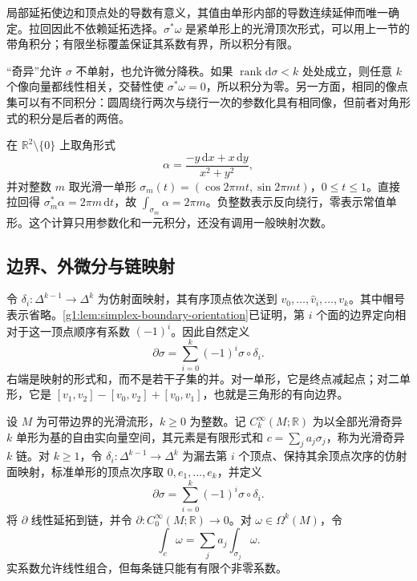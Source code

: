 局部延拓使边和顶点处的导数有意义，其值由单形内部的导数连续延伸而唯一确定。拉回因此不依赖延拓选择。\(\sigma^*\omega\) 是紧单形上的光滑顶次形式，可以用上一节的带角积分；有限坐标覆盖保证其系数有界，所以积分有限。

\ProseParagraphBreak

“奇异”允许 \(\sigma\) 不单射，也允许微分降秩。如果 \(\operatorname{rank}\mathrm{d}\sigma<k\) 处处成立，则任意 \(k\) 个像向量都线性相关，交替性使 \(\sigma^*\omega=0\)，所以积分为零。另一方面，相同的像点集可以有不同积分：圆周绕行两次与绕行一次的参数化具有相同像，但前者对角形式的积分是后者的两倍。

\begin{example}
	\label{g1:exm:circle-simplex-integral}
	在 \(\mathbb R^2\setminus\{0\}\) 上取角形式
	\[
		\alpha=\frac{-y\,\mathrm{d}x+x\,\mathrm{d}y}{x^2+y^2},
	\]
	并对整数 \(m\) 取光滑一单形 \(\sigma_m(t)=(\cos 2\pi mt,\sin 2\pi mt)\)，\(0\leq t\leq1\)。直接拉回得 \(\sigma_m^*\alpha=2\pi m\,\mathrm{d}t\)，故 \(\int_{\sigma_m}\alpha=2\pi m\)。负整数表示反向绕行，零表示常值单形。这个计算只用参数化和一元积分，还没有调用一般映射次数。
\end{example}

\subsection{边界、外微分与链映射}
\label{g1:subsec:1405:02}

令 \(\delta_i:\Delta^{k-1}\to\Delta^k\) 为仿射面映射，其有序顶点依次送到 \(v_0,\ldots,\widehat v_i,\ldots,v_k\)。其中帽号表示省略。\cref{g1:lem:simplex-boundary-orientation}已证明，第 \(i\) 个面的边界定向相对于这一顶点顺序有系数 \((-1)^i\)。因此自然定义
\[
	\partial\sigma=\sum_{i=0}^k(-1)^i\sigma\circ\delta_i.
\]
右端是映射的形式和，而不是若干子集的并。对一单形，它是终点减起点；对二单形，它是 \([v_1,v_2]-[v_0,v_2]+[v_0,v_1]\)，也就是三角形的有向边界。

\begin{definition}
	\label{g1:def:smooth-singular-chains}
	设 \(M\) 为可带边界的光滑流形，\(k\ge0\) 为整数。记 \(C_k^\infty(M;\mathbb R)\) 为以全部光滑奇异 \(k\) 单形为基的自由实向量空间，其元素是有限形式和 \(c=\sum_j a_j\sigma_j\)，称为光滑奇异 \(k\) 链。对 \(k\ge1\)，令 \(\delta_i:\Delta^{k-1}\to\Delta^k\) 为漏去第 \(i\) 个顶点、保持其余顶点次序的仿射面映射，标准单形的顶点次序取 \(0,e_1,\ldots,e_k\)，并定义
	\[
		\partial\sigma=\sum_{i=0}^k(-1)^i\sigma\circ\delta_i.
	\]
	将 \(\partial\) 线性延拓到链，并令 \(\partial:C_0^\infty(M;\mathbb R)\to0\)。对 \(\omega\in\Omega^k(M)\)，令
	\[
		\int_c\omega=\sum_j a_j\int_{\sigma_j}\omega.
	\]
	实系数允许线性组合，但每条链只能有有限个非零系数。
\end{definition}

